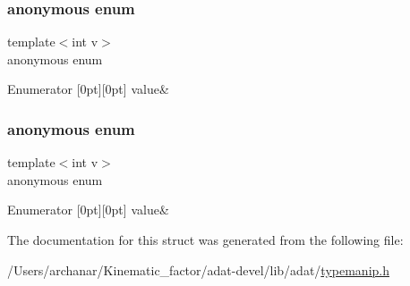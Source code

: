 \subsubsection{\texorpdfstring{anonymous enum}{anonymous enum}}
{\footnotesize\ttfamily template$<$int v$>$ \\
anonymous enum}

\begin{DoxyEnumFields}{Enumerator}
[0pt][0pt]{}\mbox{\label{structUtil_1_1Int2Type_acf7ba88f5c3aae0ff597167617d89328a1518d2442ef74c1b5020549a8384f912}} 
value&\\
\hline

\end{DoxyEnumFields}
\mbox{\label{structUtil_1_1Int2Type_acf7ba88f5c3aae0ff597167617d89328}} 
\subsubsection{\texorpdfstring{anonymous enum}{anonymous enum}}
{\footnotesize\ttfamily template$<$int v$>$ \\
anonymous enum}

\begin{DoxyEnumFields}{Enumerator}
[0pt][0pt]{}\mbox{\label{structUtil_1_1Int2Type_acf7ba88f5c3aae0ff597167617d89328a1518d2442ef74c1b5020549a8384f912}} 
value&\\
\hline

\end{DoxyEnumFields}


The documentation for this struct was generated from the following file\+:\begin{DoxyCompactItemize}
\item 
/\+Users/archanar/\+Kinematic\+\_\+factor/adat-\/devel/lib/adat/\mbox{\hyperlink{adat-devel_2lib_2adat_2typemanip_8h}{typemanip.\+h}}\end{DoxyCompactItemize}
